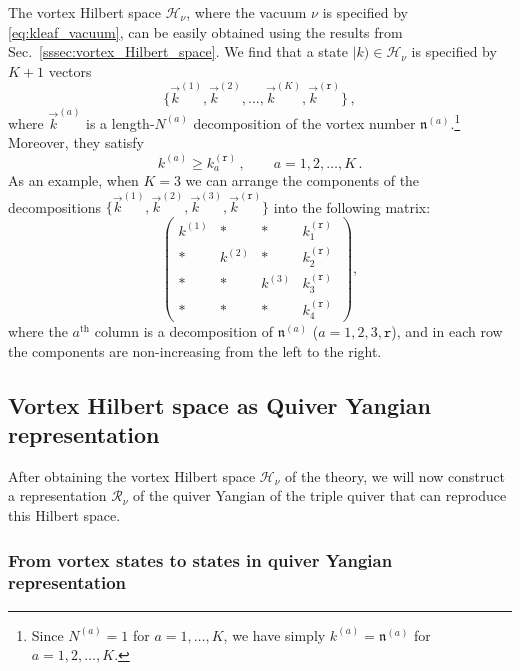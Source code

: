 \documentclass[12pt,a4paper]{article}
\newcommand{\nn}{\mathfrak{n}}
\renewcommand{\(}{\left(}
\renewcommand{\)}{\right)}
\renewcommand{\(}{\left(}
\renewcommand{\)}{\right)}
\begin{document}
The vortex Hilbert space $\mathcal{H}_\nu$, where the vacuum $\nu$ is specified by \eqref{eq:kleaf_vacuum}, can be easily obtained using the results from Sec.~\ref{sssec:vortex_Hilbert_space}. 
We find that a state $|k)\in\mathcal{H}_\nu$ is specified by $K+1$ vectors 
\begin{equation}
\{\vec{k}^{(1)},\vec{k}^{(2)},\dots,\vec{k}^{(K)},\vec{k}^{(\mathtt{r})}\}\,,
\end{equation}
where $\vec{k}^{(a)}$ is a length-$N^{(a)}$ decomposition of the vortex number $\nn^{(a)}$.\footnote{Since $N^{(a)}=1$ for $a=1,\dots,K$, we have simply $k^{(a)}=\nn^{(a)}$ for $a=1,2,\dots,K$.} 
Moreover, they satisfy
\begin{equation} \label{eq:kleaf_condi}
k^{(a)}\geq k^{(\mathtt{r})}_a\,,\qquad a=1,2,\dots,K\,.
\end{equation}
As an example, when $K=3$ we can arrange the components of the decompositions $\{\vec{k}^{(1)},\vec{k}^{(2)},\vec{k}^{(3)},\vec{k}^{(\mathtt{r})}\}$ into the following matrix:
\begin{equation}
\left(
\begin{array}{cccc}
k^{(1)} &* &* & k^{(\mathtt{r})}_1\\
*&k^{(2)}&* &k^{(\mathtt{r})}_2\\
*&* &k^{(3)}&k^{(\mathtt{r})}_3\\
*&* &* &k^{(\mathtt{r})}_4
\end{array}\,\right),
\end{equation}
where the $a^{\textrm{th}}$ column is a decomposition of $\nn^{(a)}$ ($a=1,2,3,\mathtt{r}$), and in each row the components are non-increasing from the left to the right.
	
\subsection{Vortex Hilbert space  as Quiver Yangian representation}

After obtaining the vortex Hilbert space $\mathcal{H}_\nu$ of the theory, we will now construct a representation $\mathcal{R}_{\nu}$ of the quiver Yangian of the triple quiver that can reproduce this Hilbert space. 


\subsubsection{From vortex states to states in quiver Yangian representation}
\end{document}
